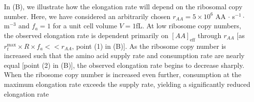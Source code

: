 In (B), we illustrate how the elongation rate will depend
on the ribosomal copy number. Here, we have considered
an arbitrarily chosen $r_{AA} = 5\times 10^6$ AA $\cdot$ s$^{-1} \cdot$ \textmu
m$^{-3}$ and $f_a = 1$ for a unit cell volume $V = 1$fL. At low ribosome copy
numbers, the observed elongation rate is dependent
primarily on $[AA]_\text{eff}$ through $r_{AA}$ [as $r_t^{\text{max}} \times R
\times f_a << r_{AA}$, point (1) in (B)]. As the
ribosome copy number is increased such that the amino acid supply rate and
consumption rate are nearly equal [point (2) in (B)],
the observed elongation rate begins to decrease sharply. When the ribosome copy
number is increased even further, consumption at the maximum elongation rate
exceeds the supply rate, yielding a significantly reduced elongation rate
